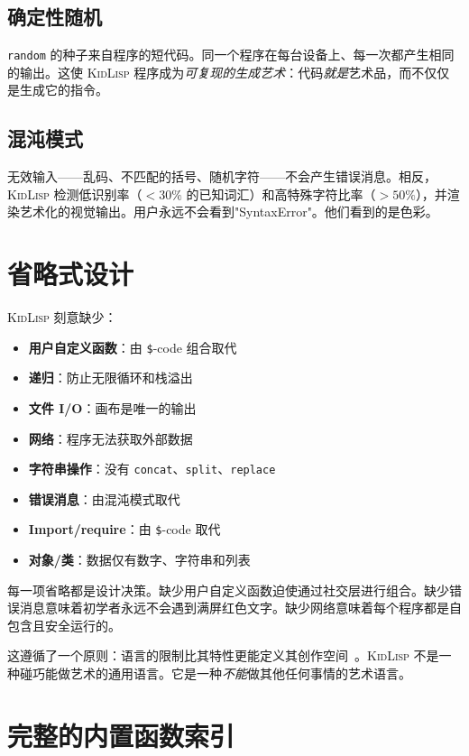 \documentclass[10pt,letterpaper,twocolumn]{article}
\newcommand{\kl}{\textsc{KidLisp}}
\begin{document}
\subsection{确定性随机}

\texttt{random} 的种子来自程序的短代码。同一个程序在每台设备上、每一次都产生相同的输出。这使 \kl{} 程序成为\emph{可复现的生成艺术}：代码\emph{就是}艺术品，而不仅仅是生成它的指令。

\subsection{混沌模式}

无效输入——乱码、不匹配的括号、随机字符——不会产生错误消息。相反，\kl{} 检测低识别率（$<30\%$ 的已知词汇）和高特殊字符比率（$>50\%$），并渲染艺术化的视觉输出。用户永远不会看到"SyntaxError"。他们看到的是色彩。

\section{省略式设计}

\kl{} 刻意缺少：

\begin{itemize}
  \item \textbf{用户自定义函数}：由 \texttt{\$}-code 组合取代
  \item \textbf{递归}：防止无限循环和栈溢出
  \item \textbf{文件 I/O}：画布是唯一的输出
  \item \textbf{网络}：程序无法获取外部数据
  \item \textbf{字符串操作}：没有 \texttt{concat}、\texttt{split}、\texttt{replace}
  \item \textbf{错误消息}：由混沌模式取代
  \item \textbf{Import/require}：由 \texttt{\$}-code 取代
  \item \textbf{对象/类}：数据仅有数字、字符串和列表
\end{itemize}

每一项省略都是设计决策。缺少用户自定义函数迫使通过社交层进行组合。缺少错误消息意味着初学者永远不会遇到满屏红色文字。缺少网络意味着每个程序都是自包含且安全运行的。

这遵循了一个原则：语言的限制比其特性更能定义其创作空间~\citep{papert1980mindstorms, compton2015casual}。\kl{} 不是一种碰巧能做艺术的通用语言。它是一种\emph{不能}做其他任何事情的艺术语言。

\section{完整的内置函数索引}
\end{document}
